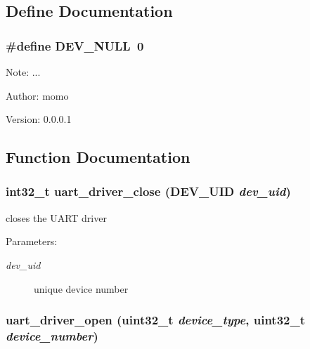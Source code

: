 \subsection{Define Documentation}
\hypertarget{group___u_a_r_t___d_r_i_v_e_r_g8a3ec48b54d63808ed4c386c320fed47}{
\subsubsection[{DEV\_\-NULL}]{\setlength{\rightskip}{0pt plus 5cm}\#define DEV\_\-NULL~0}}
\label{group___u_a_r_t___d_r_i_v_e_r_g8a3ec48b54d63808ed4c386c320fed47}


\begin{Desc}
\item[Note:]... \end{Desc}
\begin{Desc}
\item[Author:]momo \end{Desc}
\begin{Desc}
\item[Version:]0.0.0.1 \end{Desc}


\subsection{Function Documentation}
\hypertarget{group___u_a_r_t___d_r_i_v_e_r_ga894da78cf2a50d46371a5db778827b6}{
\subsubsection[{uart\_\-driver\_\-close}]{\setlength{\rightskip}{0pt plus 5cm}int32\_\-t uart\_\-driver\_\-close ({\bf DEV\_\-UID} {\em dev\_\-uid})}}
\label{group___u_a_r_t___d_r_i_v_e_r_ga894da78cf2a50d46371a5db778827b6}


closes the UART driver \begin{Desc}
\item[Parameters:]
\begin{description}
\item[{\em dev\_\-uid}]unique device number \end{description}
\end{Desc}
\hypertarget{group___u_a_r_t___d_r_i_v_e_r_g21a2031520a7294468c5e6f74829a741}{
\subsubsection[{uart\_\-driver\_\-open}]{ uart\_\-driver\_\-open (uint32\_\-t {\em device\_\-type}, \/  uint32\_\-t {\em device\_\-number})}}
\label{group___u_a_r_t___d_r_i_v_e_r_g21a2031520a7294468c5e6f74829a741}


